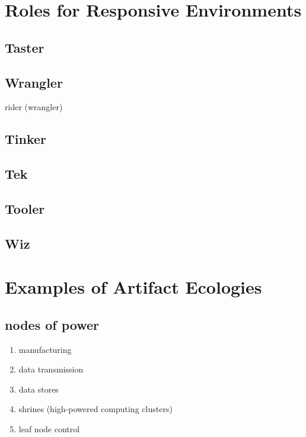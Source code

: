 \section{Roles for Responsive Environments}
\label{sec:roles}
%
\subsection{Taster}

\subsection{Wrangler}
rider (wrangler)

\subsection{Tinker}

\subsection{Tek}

\subsection{Tooler}

\subsection{Wiz}




\section{Examples of Artifact Ecologies}
\label{sec:artifact_ecologies}
%
\subsection{nodes of power}
        \begin{enumerate}
            \item manufacturing
            \item data transmission
            \item data stores
            \item shrines (high-powered computing clusters)
            \item leaf node control
        \end{enumerate}        


